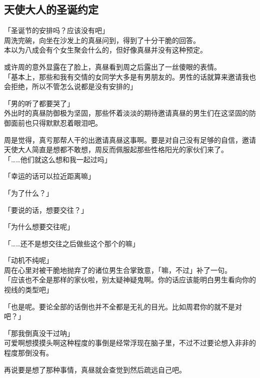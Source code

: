 \subsection{天使大人的圣诞约定}

「圣诞节的安排吗？应该没有吧」\\

周洗完碗，向坐在沙发上的真昼问到，得到了十分干脆的回答。\\

本以为八成会有个女生聚会什么的，但好像真昼并没有这种预定。

或许周的意外显露在了脸上，真昼看到周之后露出了一丝傻眼的表情。\\

「基本上，那些和我有交情的女同学大多是有男朋友的。男性的话就算来邀请我也会拒绝，所以不管怎么说都是没有安排的」

「男的听了都要哭了」\\

外出时的真昼防御极为坚固，那些怀着淡淡的期待邀请真昼的男生们在这坚固的防御面前也只得默默忍着眼泪吧。

周是觉得，真亏那帮人干的出邀请真昼这事啊。要是对自己没有足够的自信，邀请天使大人简直是想都不敢想，周反而佩服起那些性格阳光的家伙们来了。\\

「……他们就这么想和我一起过吗」

「幸运的话可以拉近距离嘛」

「为了什么？」

「要说的话，想要交往？」

「为什么想要交往呢」

「……还不是想交往之后做些这个那个的嘛」

「动机不纯呢」\\

周在心里对被干脆地抛弃了的诸位男生合掌致意，「嘛，不过」补了一句。\\

「应该也不全是那样的家伙啦，别太疑神疑鬼啊。你的话应该能明白男生看向你的视线的类型吧」

「也是呢。要论全部的话倒也并不全都是无礼的目光。比如周君你的就不是对吧？」

「那我倒真没干过呐」\\

可爱啊想摸摸头啊这种程度的事倒是经常浮现在脑子里，不过不过要论想入非非的程度那倒没有。

再说要是想了那种事情，真昼就会查觉到然后疏远自己吧。\\

